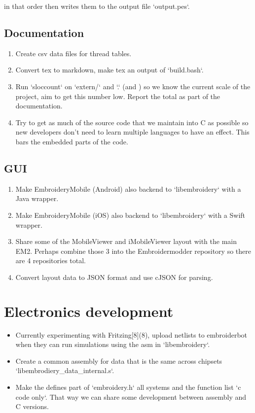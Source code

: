 \documentclass{report}
\begin{document}
in that order then writes them to the output file `output.pes`.

\subsection{Documentation}

\begin{enumerate}
\item Create csv data files for thread tables.
\item Convert tex to markdown, make tex an output of `build.bash`.
\item Run `sloccount` on `extern/` and `.` (and ) so we know the current scale of the project, aim to get this number low. Report the total as part of the documentation.
\item Try to get as much of the source code that we maintain into C as possible so new developers don't need to learn multiple languages to have an effect. This bars the embedded parts of the code. 
\end{enumerate}

\subsection{GUI}

\begin{enumerate}
\item Make EmbroideryMobile (Android) also backend to `libembroidery` with a Java wrapper.
\item Make EmbroideryMobile (iOS) also backend to `libembroidery` with a Swift wrapper.
\item Share some of the MobileViewer and iMobileViewer layout with the main EM2. Perhaps combine those 3 into the Embroidermodder repository so there are 4 repositories total.
\item Convert layout data to JSON format and use cJSON for parsing.
\end{enumerate}

\section{Electronics development}

\begin{itemize}
\item Currently experimenting with Fritzing[8](8), upload netlists to embroiderbot when they can run simulations using the asm in `libembroidery`.
\item Create a common assembly for data that is the same across chipsets `libembrodiery\_data\_internal.s`.
\item Make the defines part of `embroidery.h` all systems and the function list `c code only`. That way we can share some development between assembly and C versions.
\end{itemize}
\end{document}
